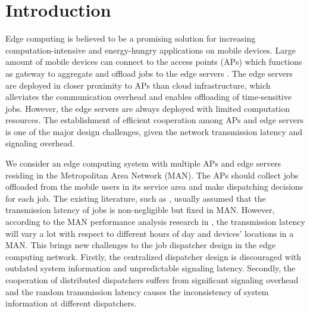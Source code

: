 
\section{Introduction}
Edge computing is believed to be a promising solution for increasing computation-intensive and energy-hungry applications on mobile devices.
Large amount of mobile devices can connect to the access points (APs) which functions as gateway to aggregate and offload jobs to the edge servers \cite{MEC-SURVEY}.
The edge servers are deployed in closer proximity to APs than cloud infrastructure, which alleviates the communication overhead and enables offloading of time-sensitive jobs.
However, the edge servers are always deployed with limited computation resources.
The establishment of efficient cooperation among APs and edge servers is one of the major design challenges, given the network transmission latency and signaling overhead.

We consider an edge computing system with multiple APs and edge servers residing in the Metropolitan Area Network (MAN).
The APs should collect jobs offloaded from the mobile users in its service area and make dispatching decisions for each job.
The existing literature, such as \cite{tan-online,MOBIHOC19-ZhouZ,IOTJ18-FanQ,TOC19-LiuC,JSAC19-AlameddineHA}, usually assumed that the transmission latency of jobs is non-negligible but fixed in MAN.
However, according to the MAN performance analysis research in \cite{MAN-LATENCY}, the transmission latency will vary a lot with respect to different hours of day and devices' locations in a MAN.
This brings new challenges to the job dispatcher design in the edge computing network.
Firstly, the centralized dispatcher design is discouraged with outdated system information and unpredictable signaling latency.
Secondly, the cooperation of distributed dispatchers suffers from significant signaling overhead and the random transmission latency causes the inconsistency of system information at different dispatchers.

